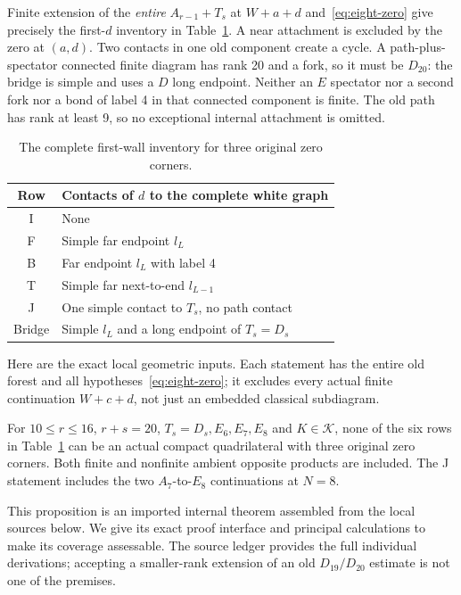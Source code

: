 Finite extension of the \emph{entire} $A_{r-1}+T_s$ at $W+a+d$
and~\eqref{eq:eight-zero} give precisely the first-$d$ inventory
in Table~\ref{tab:eight-d}. A near attachment is excluded by the
zero at $(a,d)$. Two contacts in one old component create a cycle.
A path-plus-spectator connected finite diagram has rank 20 and a
fork, so it must be $D_{20}$: the bridge is simple and uses a
$D$ long endpoint. Neither an $E$ spectator nor a second fork nor
a bond of label 4 in that connected component is finite. The old path has
rank at least 9, so no exceptional internal attachment is omitted.
\begin{table}[ht]
\centering
\begin{tabular}{cl}\toprule
Row&Contacts of $d$ to the complete white graph\\\midrule
I&None\\
F&Simple far endpoint $l_L$\\
B&Far endpoint $l_L$ with label 4\\
T&Simple far next-to-end $l_{L-1}$\\
J&One simple contact to $T_s$, no path contact\\
Bridge&Simple $l_L$ and a long endpoint of $T_s=D_s$\\\bottomrule
\end{tabular}
\caption{The complete first-wall inventory for three original zero corners.}
\label{tab:eight-d}
\end{table}

Here are the exact local geometric inputs. Each statement has the
entire old forest and all hypotheses~\eqref{eq:eight-zero}; it
excludes every actual finite continuation $W+c+d$, not just an
embedded classical subdiagram.
\begin{proposition}\label{prop:eight-six}
For $10\le r\le16$, $r+s=20$, $T_s=D_s,E_6,E_7,E_8$ and
$K\in\mathcal K$, none of the six rows in
Table~\ref{tab:eight-d} can be an actual compact quadrilateral
with three original zero corners. Both finite and nonfinite ambient
opposite products are included. The J statement includes the two
$A_7$-to-$E_8$ continuations at $N=8$.
\end{proposition}
This proposition is an imported internal theorem assembled from the
local sources below. We give its exact proof interface and principal
calculations to make its coverage assessable. The source ledger provides
the full individual derivations; accepting a smaller-rank extension of
an old $D_{19}/D_{20}$ estimate is not one of the premises.

